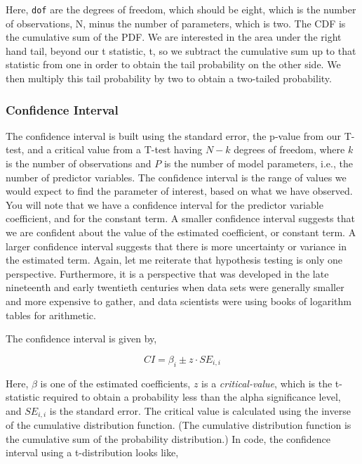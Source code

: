 Here, \texttt{dof} are the degrees of freedom, which should be eight, which is the number of observations, N, minus the number of parameters, which is two. The CDF is the cumulative sum of the PDF. We are interested in the area under the right hand tail, beyond our t statistic, t, so we subtract the cumulative sum up to that statistic from one in order to obtain the tail probability on the other side. We then multiply this tail probability by two to obtain a two-tailed probability.

\subsubsection{Confidence Interval}

The confidence interval is built using the standard error, the p-value from our T-test, and a critical value from a T-test having $N-k$ degrees of freedom, where $k$ is the number of observations and $P$ is the number of model parameters, i.e., the number of predictor variables. The confidence interval is the range of values we would expect to find the parameter of interest, based on what we have observed. You will note that we have a confidence interval for the predictor variable coefficient, and for the constant term. A smaller confidence interval suggests that we are confident about the value of the estimated coefficient, or constant term. A larger confidence interval suggests that there is more uncertainty or variance in the estimated term. Again, let me reiterate that hypothesis testing is only one perspective. Furthermore, it is a perspective that was developed in the late nineteenth and early twentieth centuries when data sets were generally smaller and more expensive to gather, and data scientists were using books of logarithm tables for arithmetic.

The confidence interval is given by,

\begin{equation}
    CI =  \beta_{i} \pm z \cdot SE_{i,i}
\end{equation}

Here, $\beta$ is one of the estimated coefficients, $z$ is a \emph{critical-value}, which is the t-statistic required to obtain a probability less than the alpha significance level, and $SE_{i,i}$ is the standard error. The critical value is calculated using the inverse of the cumulative distribution function. (The cumulative distribution function is the cumulative sum of the probability distribution.) In code, the confidence interval using a t-distribution looks like,

